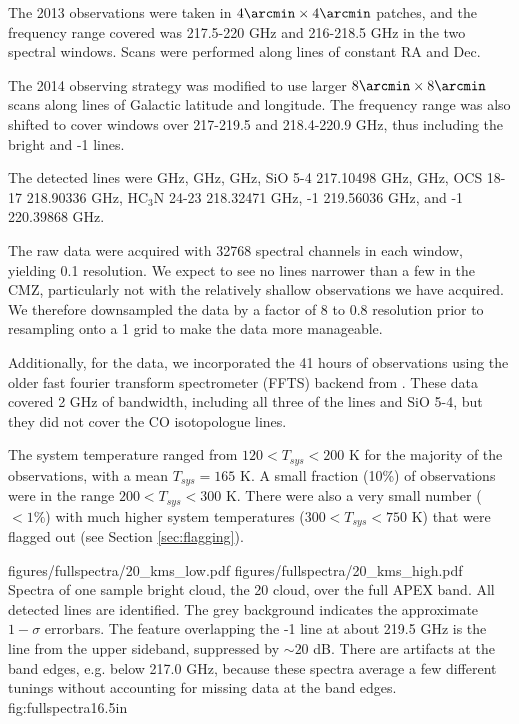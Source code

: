 The 2013 observations were taken in $4\arcmin \times 4\arcmin$ patches, and the
frequency range covered was 217.5-220 GHz and 216-218.5 GHz in the two spectral
windows. Scans were performed along lines of constant RA and Dec.

The 2014 observing strategy was modified to use larger $8\arcmin \times
8\arcmin$ scans along lines of Galactic latitude and longitude.  The frequency
range was also shifted to cover windows over 217-219.5 and 218.4-220.9 GHz, thus
including the bright \thirteenco and -1 lines.

 The detected lines were \para {} GHz, \para {} GHz, \para {} GHz, SiO 5-4 217.10498 GHz,
 \methanol {} GHz, OCS 18-17 218.90336 GHz, HC$_3$N 24-23
 218.32471 GHz, -1 219.56036 GHz, and -1 220.39868
 GHz.  


The raw data were acquired with 32768 spectral channels in each window,
yielding 0.1 \kms resolution.  We expect to see no lines narrower than a few
\kms in the CMZ, particularly not with the relatively shallow observations we
have acquired.  We therefore downsampled the data by a factor of 8 to 0.8 \kms
resolution prior to resampling onto a 1 \kms grid to make the data more
manageable.  

Additionally, for the \para data, we incorporated the 41 hours of observations
using the older fast fourier transform spectrometer (FFTS) backend from
\citet{Ao2013a}.  These data covered 2 GHz of bandwidth, including all three of
the \para lines and SiO 5-4, but they did not cover the CO isotopologue lines.

The system temperature ranged from $120 < T_{sys} < 200$ K for the majority of
the observations, with a mean $T_{sys}=165$ K.  A small fraction (10\%) of
observations were in the range $200 < T_{sys} < 300$ K.  There were also a very
small number ($<1\%$) with much higher system temperatures ($300 < T_{sys} <
750$ K) that were flagged out (see Section \ref{sec:flagging}).

\FigureTwoAA
{figures/fullspectra/20_kms_low.pdf}
{figures/fullspectra/20_kms_high.pdf}
{Spectra of one sample bright cloud, the 20 \kms cloud, over the full APEX band.
All detected lines are identified.  The grey background indicates the
approximate $1-\sigma$ errorbars. The feature overlapping the -1
line at about 219.5 GHz is the \twelveco line from the upper sideband,
suppressed by $\sim20$ dB.
There are artifacts at the band edges, e.g. below 217.0 GHz, because these
spectra average a few different tunings without accounting for missing data at
the band edges.}
{fig:fullspectra}{1}{6.5in}


